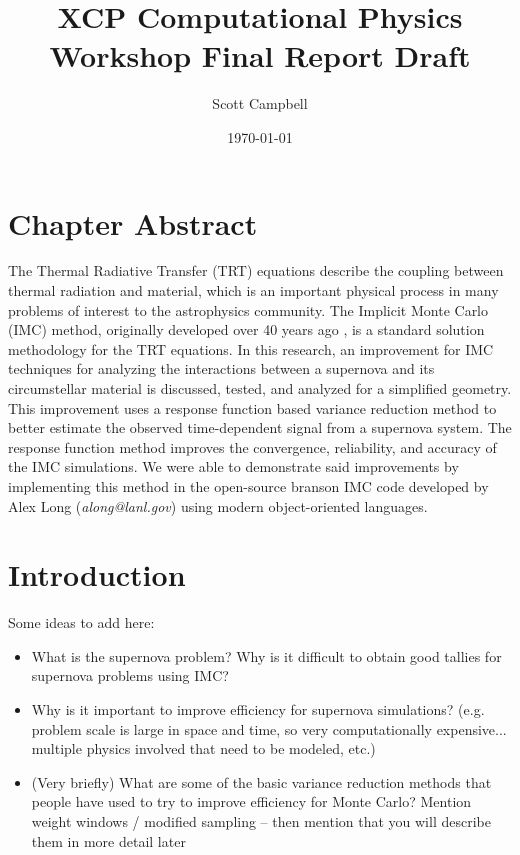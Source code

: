\documentclass[]{article}
\begin{document}
	\title{XCP Computational Physics Workshop Final Report Draft}
	\author{Scott Campbell}
	\date{\today}

	\maketitle

\section{Chapter Abstract}
  The Thermal Radiative Transfer (TRT) equations describe the coupling between thermal radiation and material, which is an important physical process in many problems of interest to the astrophysics community. The Implicit Monte Carlo (IMC) method, originally developed over 40 years ago \cite{FC71}, is a standard solution methodology for the TRT equations.
  In this research, an improvement for IMC techniques for analyzing the interactions between a supernova and its circumstellar material is discussed, tested, and analyzed for a simplified geometry. This improvement uses a response function based variance reduction method to better estimate the observed time-dependent signal from a supernova system. The response function method improves the convergence, reliability, and accuracy of the IMC simulations. We were able to demonstrate said improvements by implementing this method in the open-source branson IMC code developed by Alex Long (\textit{along@lanl.gov}) using modern object-oriented languages.

\section{Introduction}
  Some ideas to add here:
  \begin{itemize}
    \item What is the supernova problem? Why is it difficult to obtain good tallies for supernova problems using IMC?
    \item Why is it important to improve efficiency for supernova simulations? (e.g. problem scale is large in space and time, so very computationally expensive... multiple physics involved that need to be modeled, etc.)
    \item (Very briefly) What are some of the basic variance reduction methods that people have used to try to improve efficiency for Monte Carlo? Mention weight windows / modified sampling -- then mention that you will describe them in more detail later
  \end{itemize}
\end{document}
